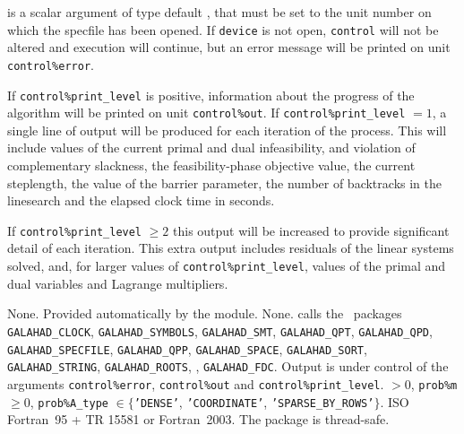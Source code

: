 \documentclass{galahad}
\newcommand{\packagename}{WCP}
\begin{document}
\begin{description}
 is a scalar \intentin argument of type default \integer,
that must be set to the unit number on which the specfile
has been opened. If {\tt device} is not open, {\tt control} will
not be altered and execution will continue, but an error message
will be printed on unit {\tt control\%error}.

\end{description}


\galinfo
If {\tt control\%print\_level} is positive, information about the progress 
of the algorithm will be printed on unit {\tt control\-\%out}.
If {\tt control\%print\_level} $= 1$, a single line of output will be produced 
for each iteration of the process. 
This will include values of the current primal and dual infeasibility, and
violation of complementary slackness, the feasibility-phase objective value,
the current steplength, the value of the barrier parameter, the
number of backtracks in the linesearch and the elapsed clock time in seconds.

If {\tt control\%print\_level} $\geq 2$ this 
output will be increased to provide significant detail of each iteration. 
This extra output includes residuals of the linear systems solved, and,
for larger values of {\tt control\%print\_level}, values of the primal and dual
variables and Lagrange multipliers. 


\galgeneral

\galcommon None.
\galworkspace Provided automatically by the module.
\galroutines None. 
\galmodules {\tt \packagename\_solve} calls the \galahad\ packages
{\tt GALAHAD\_\-CLOCK},
{\tt GALAHAD\_SY\-M\-BOLS}, 
{\tt GALAHAD\_SMT},
{\tt GALAHAD\_QPT}, {\tt GALAHAD\_QPD}, {\tt GALAHAD\_SPECFILE}, 
{\tt GALAHAD\_QPP}, {\tt GALAHAD\_SPACE}, {\tt GALAHAD\_SORT}, 
{\tt GALAHAD\_STRING}, {\tt GALAHAD\_\-ROOTS}, ,
{\tt GALAHAD\_FDC}.
\galio Output is under control of the arguments
 {\tt control\%error}, {\tt control\%out} and {\tt control\%print\_level}.
 $> 0$, {\tt prob\%m} $\geq  0$, 
{\tt prob\%A\_type} $\in \{${\tt 'DENSE'}, 
 {\tt 'COORDINATE'}, {\tt 'SPARSE\_BY\_ROWS'}$\}$. 
\galportability ISO Fortran~95 + TR 15581 or Fortran~2003. 
The package is thread-safe.

\end{document}
